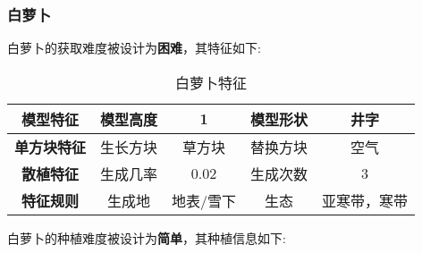 \subsubsection{白萝卜}

白萝卜的获取难度被设计为\textbf{困难}，其特征如下:
\begin{table}[H]
    \centering
    \caption{白萝卜特征}
    \label{table:白萝卜特征}
    \setlength{\tabcolsep}{4mm}
    \begin{tabular}{c|cc|cc}
        \toprule
        \textbf{模型特征}   & 模型高度 & 1      & 模型形状 & 井字     \\
        \midrule
        \textbf{单方块特征} & 生长方块 & 草方块 & 替换方块 & 空气     \\
        \midrule
        \textbf{散植特征}   & 生成几率 & 0.02   & 生成次数 & 3        \\
        \midrule
        \textbf{特征规则}   & 生成地   & 地表/雪下   & 生态   & 亚寒带，寒带 \\
        \bottomrule
    \end{tabular}
\end{table}


白萝卜的种植难度被设计为\textbf{简单}，其种植信息如下:

